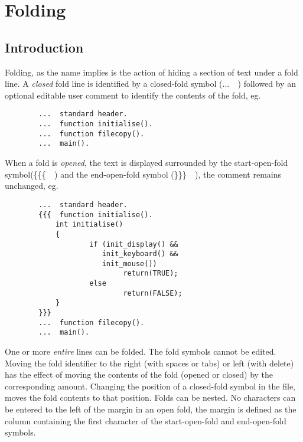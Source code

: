 \chapter{Folding}

\section{Introduction}

Folding, as the name implies is the action of  hiding a section of text
under a fold line. A {\em closed} fold line is identified by a
closed-fold symbol (...\verb*+  +) followed by an optional editable
user comment to  identify the contents of the fold, eg.

\begin{verbatim}
        ...  standard header.   
        ...  function initialise().   
        ...  function filecopy().   
        ...  main().   
\end{verbatim}

When a fold is {\em opened}, the text is displayed surrounded by the
start-open-fold symbol(\{\{\{\verb*+  +) and the  end-open-fold symbol
(\}\}\}\verb*+  +),  the comment remains unchanged, eg.

\begin{verbatim}
        ...  standard header.   
        {{{  function initialise().   
            int initialise()
            {
                    if (init_display() &&
                       init_keyboard() &&
                       init_mouse())
                            return(TRUE);
                    else
                            return(FALSE);
            }
        }}}
        ...  function filecopy().   
        ...  main().   
\end{verbatim}

One or more {\em entire} lines can be folded. The fold symbols cannot
be edited. Moving the fold identifier to the right (with spaces or
tabs) or left (with delete) has the effect of moving the contents of
the fold (opened or closed) by the corresponding amount. Changing the
position of a closed-fold symbol in the  file, moves the fold contents
to that position. Folds can be nested. No characters can be entered to
the left of the margin in an open fold, the margin is defined as the
column containing the first character of the start-open-fold and
end-open-fold symbols.


